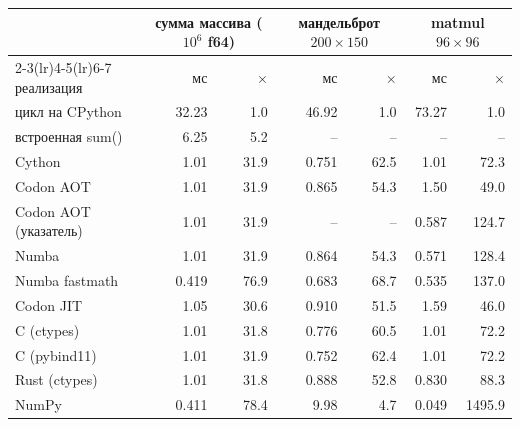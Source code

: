 \begin{tabular}{lrrrrrr}
\toprule
& \multicolumn{2}{c}{сумма массива ($10^6$ f64)} & \multicolumn{2}{c}{мандельброт $200{\times}150$} & \multicolumn{2}{c}{matmul $96{\times}96$} \\
\cmidrule(lr){2-3}\cmidrule(lr){4-5}\cmidrule(lr){6-7}
реализация & мс & $\times$ & мс & $\times$ & мс & $\times$ \\
\midrule
цикл на CPython & 32.23 & 1.0 & 46.92 & 1.0 & 73.27 & 1.0 \\
встроенная sum() & 6.25 & 5.2 & -- & -- & -- & -- \\
Cython & 1.01 & 31.9 & 0.751 & 62.5 & 1.01 & 72.3 \\
Codon AOT & 1.01 & 31.9 & 0.865 & 54.3 & 1.50 & 49.0 \\
Codon AOT (указатель) & 1.01 & 31.9 & -- & -- & 0.587 & 124.7 \\
Numba & 1.01 & 31.9 & 0.864 & 54.3 & 0.571 & 128.4 \\
Numba fastmath & 0.419 & 76.9 & 0.683 & 68.7 & 0.535 & 137.0 \\
Codon JIT & 1.05 & 30.6 & 0.910 & 51.5 & 1.59 & 46.0 \\
C (ctypes) & 1.01 & 31.8 & 0.776 & 60.5 & 1.01 & 72.2 \\
C (pybind11) & 1.01 & 31.9 & 0.752 & 62.4 & 1.01 & 72.2 \\
Rust (ctypes) & 1.01 & 31.8 & 0.888 & 52.8 & 0.830 & 88.3 \\
NumPy & 0.411 & 78.4 & 9.98 & 4.7 & 0.049 & 1495.9 \\
\bottomrule
\end{tabular}
